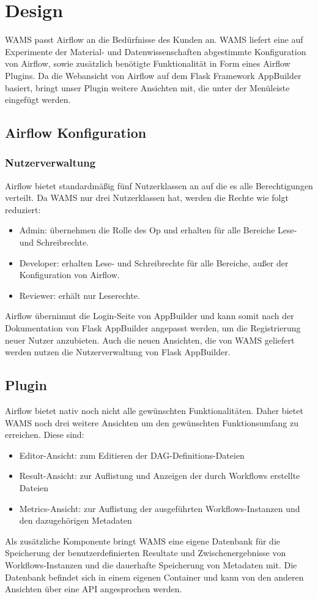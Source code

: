 \chapter{Design}
WAMS passt Airflow an die Bedürfnisse des Kunden an. WAMS liefert eine auf Experimente der Material- und Datenwissenschaften abgestimmte Konfiguration von Airflow, sowie zusätzlich benötigte Funktionalität in Form eines Airflow Plugins. Da die Webansicht von Airflow auf dem Flask Framework \gls{AppBuilder} basiert, bringt unser Plugin weitere Ansichten mit, die unter der Menüleiste eingefügt werden.

\section{Airflow Konfiguration}
\subsection{Nutzerverwaltung}
Airflow bietet standardmäßig fünf Nutzerklassen an auf die es alle Berechtigungen verteilt. Da WAMS nur drei Nutzerklassen hat, werden die Rechte wie folgt reduziert:
\begin{itemize}
    \item Admin: übernehmen die Rolle des \gls{Op} und erhalten für alle Bereiche
    Lese- und Schreibrechte. 
    \item Developer: erhalten Lese- und Schreibrechte für alle Bereiche, außer der Konfiguration von Airflow.
    \item Reviewer: erhält nur Leserechte.
\end{itemize}

Airflow übernimmt die Login-Seite von \gls{AppBuilder} und kann somit nach der Dokumentation von Flask \gls{AppBuilder} angepasst werden, um die Registrierung neuer
Nutzer anzubieten. Auch die neuen Ansichten, die von WAMS geliefert werden nutzen die 
Nutzerverwaltung von Flask \gls{AppBuilder}.

\section{Plugin}
Airflow bietet nativ noch nicht alle gewünschten Funktionalitäten. Daher bietet WAMS
noch drei weitere Ansichten um den gewünschten Funktionsumfang zu erreichen. Diese sind:
\begin{itemize}
    \item Editor-Ansicht: zum Editieren der DAG-Definitions-Dateien
    \item Result-Ansicht: zur Auflistung und Anzeigen der durch Workflows erstellte Dateien
    \item Metrics-Ansicht: zur Auflistung der ausgeführten Workflows-Instanzen 
    und den dazugehörigen Metadaten
\end{itemize}
Als zusätzliche Komponente bringt WAMS eine eigene Datenbank für die 
Speicherung der benutzerdefinierten Resultate und Zwischenergebnisse von Workflows-Instanzen und die dauerhafte Speicherung von Metadaten mit. Die Datenbank befindet sich in einem eigenen Container und kann von den anderen Ansichten über eine API angesprochen werden. %

